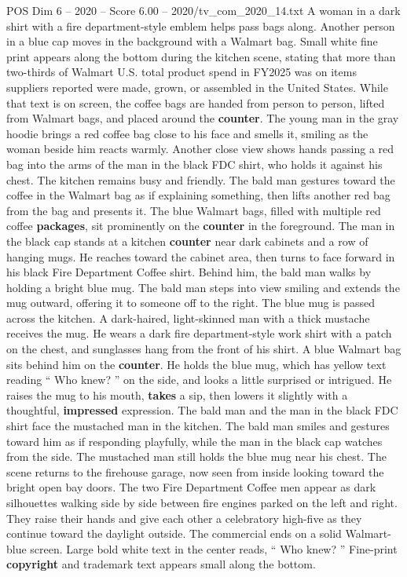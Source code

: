 \begin{textsample}{POS Dim 6 – 2020 – Score 6.00 – 2020/tv\_com\_2020\_14.txt}
A woman in a dark shirt with a fire department-style emblem helps pass bags along.
Another person in a blue cap moves in the background with a Walmart bag.
Small white fine print appears along the bottom during the kitchen scene, stating that more than two-thirds of Walmart U.S. total product spend in FY2025 was on items suppliers reported were made, grown, or assembled in the United States.
While that text is on screen, the coffee bags are handed from person to person, lifted from Walmart bags, and placed around the \textbf{counter}.
The young man in the gray hoodie brings a red coffee bag close to his face and smells it, smiling as the woman beside him reacts warmly.
Another close view shows hands passing a red bag into the arms of the man in the black FDC shirt, who holds it against his chest.
The kitchen remains busy and friendly.
The bald man gestures toward the coffee in the Walmart bag as if explaining something, then lifts another red bag from the bag and presents it.
The blue Walmart bags, filled with multiple red coffee \textbf{packages}, sit prominently on the \textbf{counter} in the foreground.
The man in the black cap stands at a kitchen \textbf{counter} near dark cabinets and a row of hanging mugs.
He reaches toward the cabinet area, then turns to face forward in his black Fire Department Coffee shirt.
Behind him, the bald man walks by holding a bright blue mug.
The bald man steps into view smiling and extends the mug outward, offering it to someone off to the right.
The blue mug is passed across the kitchen.
A dark-haired, light-skinned man with a thick mustache receives the mug.
He wears a dark fire department-style work shirt with a patch on the chest, and sunglasses hang from the front of his shirt.
A blue Walmart bag sits behind him on the \textbf{counter}.
He holds the blue mug, which has yellow text reading “ Who knew? ” on the side, and looks a little surprised or intrigued.
He raises the mug to his mouth, \textbf{takes} a sip, then lowers it slightly with a thoughtful, \textbf{impressed} expression.
The bald man and the man in the black FDC shirt face the mustached man in the kitchen.
The bald man smiles and gestures toward him as if responding playfully, while the man in the black cap watches from the side.
The mustached man still holds the blue mug near his chest.
The scene returns to the firehouse garage, now seen from inside looking toward the bright open bay doors.
The two Fire Department Coffee men appear as dark silhouettes walking side by side between fire engines parked on the left and right.
They raise their hands and give each other a celebratory high-five as they continue toward the daylight outside.
The commercial ends on a solid Walmart-blue screen.
Large bold white text in the center reads, “ Who knew? ” Fine-print \textbf{copyright} and trademark text appears small along the bottom.

\end{textsample}
